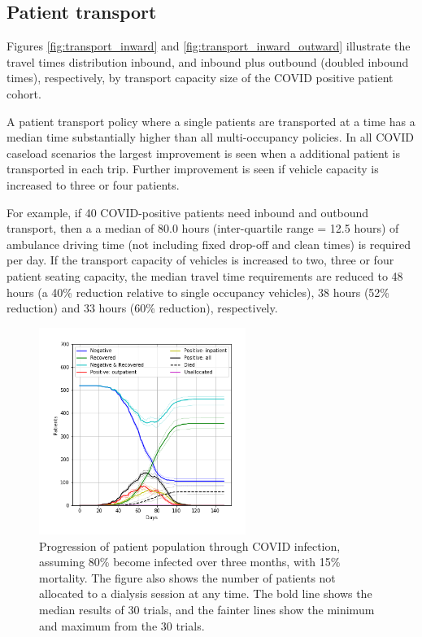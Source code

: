 \begin{multicols}{2}
\subsection{Patient transport}

Figures \ref{fig:transport_inward} and \ref{fig:transport_inward_outward} illustrate the travel times distribution inbound, and inbound plus outbound (doubled inbound times), respectively, by transport capacity size of the COVID positive patient cohort. 

A patient transport policy where a single patients are transported at a time has a median time substantially higher than all multi-occupancy policies. In all COVID caseload scenarios the largest improvement is seen when a additional patient is transported in each trip. Further improvement is seen if vehicle capacity is increased to three or four patients.  

For example, if 40 COVID-positive patients need inbound and outbound transport, then a a median of 80.0 hours (inter-quartile range = 12.5 hours) of ambulance driving time (not including fixed drop-off and clean times) is required per day. If the transport capacity of vehicles is increased to two, three or four patient seating capacity, the median travel time requirements are reduced to 48 hours (a 40\% reduction relative to single occupancy vehicles), 38 hours (52\% reduction) and 33 hours (60\% reduction), respectively.

\end{multicols}

\begin{figure}
\centering
\includegraphics[width=0.6\textwidth]{image/patients_base_3_month.png}
\caption{Progression of patient population through COVID infection, assuming 80\% become infected over three months, with 15\% mortality. The figure also shows the number of patients not allocated to a dialysis session at any time. The bold line shows the median results of 30 trials, and the fainter lines show the minimum and maximum from the 30 trials.}
\label{fig:patients_base_3_month}
\end{figure}


